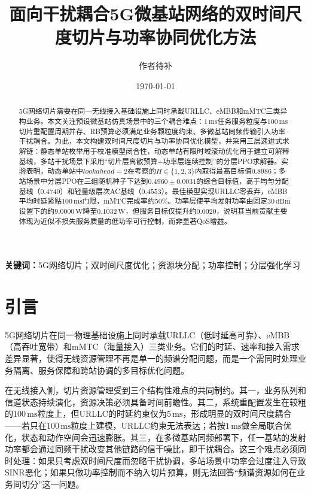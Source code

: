 \documentclass[UTF8,a4paper,12pt,fontset=fandol]{ctexart}
\title{面向干扰耦合5G微基站网络的双时间尺度切片与功率协同优化方法}
\author{作者待补}
\date{\today}
\begin{document}
\maketitle

\begin{abstract}
5G网络切片需要在同一无线接入基础设施上同时承载URLLC、eMBB和mMTC三类异构业务。本文关注预设微基站仿真场景中的三个耦合难点：$1\,\mathrm{ms}$任务服务粒度与$100\,\mathrm{ms}$切片重配置周期并存、RB预算必须满足业务颗粒度约束、多微基站同频传输引入功率--干扰耦合。为此，本文构建双时间尺度切片与功率协同优化模型，并采用三层递进式求解链：静态单站枚举用于校准模型闭合性，动态单站有限时域滚动优化用于建立可解释基线，多站干扰场景下采用``切片层离散预算+功率层连续控制''的分层PPO求解器。实验表明，动态单站中$lookahead=2$在考察的$H\in\{1,2,3\}$内取得最高目标值$0.8986$；多站场景中分层PPO在三组随机种子下达到$0.4960\pm0.0031$的综合目标值，高于均匀分配基线（$0.4740$）和轻量级层次AC基线（$0.4553$）。最佳模型实现URLLC零丢弃，eMBB平均时延紧贴$100\,\mathrm{ms}$门限，mMTC完成率约50\%。功率层使平均发射功率由固定$30\,\mathrm{dBm}$设置下的约$9.0000\,\mathrm{W}$降至$0.1032\,\mathrm{W}$，但服务目标仅提升约$0.0020$，说明其当前贡献主要体现为近似不损失服务质量的低功率可行控制，而非显著QoS增益。
\end{abstract}

\noindent\textbf{关键词：}5G网络切片；双时间尺度优化；资源块分配；功率控制；分层强化学习

\section{引言}

5G网络切片在同一物理基础设施上同时承载URLLC（低时延高可靠）、eMBB（高吞吐宽带）和mMTC（海量接入）三类业务。它们的时延、速率和接入需求差异显著，使得无线资源管理不再是单一的频谱分配问题，而是一个需同时处理业务隔离、服务保障和跨站协调的多目标优化问题。

在无线接入侧，切片资源管理受到三个结构性难点的共同制约。其一，业务队列和信道状态持续演化，资源决策必须具备时间前瞻性。其二，系统重配置发生在较粗的$100\,\mathrm{ms}$粒度上，但URLLC的时延约束仅为$5\,\mathrm{ms}$，形成明显的双时间尺度耦合——若只在$100\,\mathrm{ms}$粒度上建模，URLLC约束无法表达；若按$1\,\mathrm{ms}$做全局联合优化，状态和动作空间会迅速膨胀。其三，在多微基站同频部署下，任一基站的发射功率都会通过同频干扰改变其他链路的信干噪比，即干扰耦合。这三个难点必须同时处理：如果只考虑双时间尺度而忽略干扰协调，多站场景中功率会过度注入导致SINR恶化；如果只做功率控制而不纳入切片预算，则无法回答``频谱资源如何在业务间切分''这一问题。
\end{document}
